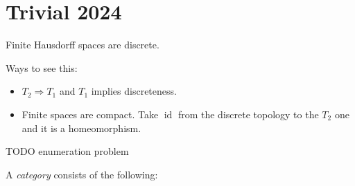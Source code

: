 \section{Trivial 2024}

\begin{proposition}
    Finite Hausdorff spaces are discrete.

    Ways to see this:
    \begin{itemize}
        \item $T_2\Longrightarrow T_1$ and $T_1$ implies discreteness.
        \item Finite spaces are compact. Take $\operatorname{id}$ from the discrete topology to the $T_2$ one and it is a homeomorphism.
    \end{itemize}
\end{proposition}

\begin{proposition}
    TODO enumeration problem
\end{proposition}

\begin{proposition}
    A \emph{category} consists of the following:
\end{proposition}